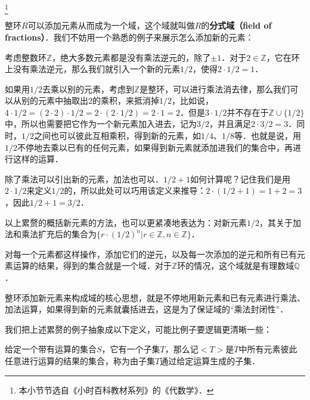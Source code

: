 


\footnote{本小节节选自《小时百科教材系列》的《代数学》．}


整环$R$可以添加元素从而成为一个域，这个域就叫做$R$的\textbf{分式域（field of fractions）}．我们不妨用一个熟悉的例子来展示怎么添加新的元素：

\begin{example}{}
考虑整数环$\mathbb{Z}$，绝大多数元素都是没有乘法逆元的，除了$\pm 1$．对于$2\in\mathbb{Z}$，它在环上没有乘法逆元，那么我们就引入一个新的元素$1/2$，使得$2\cdot 1/2=1$．

如果用$1/2$去乘以别的元素，考虑到$\mathbb{Z}$是整环，可以进行乘法消去律，那么我们可以从别的元素中抽取出$2$的乘积，来抵消掉$1/2$，比如说，$4\cdot 1/2=(2\cdot 2)\cdot 1/2=2\cdot(2\cdot 1/2)=2\cdot 1=2$．但是$3\cdot 1/2$并不存在于$\mathbb{Z}\cup\{1/2\}$中，所以也需要把它作为一个新元素加入进去，记为$3/2$，并且满足$2\cdot 3/2=3$．同时，$1/2$之间也可以彼此互相乘积，得到新的元素，如$1/4$、$1/8$等．也就是说，用$1/2$不停地去乘以已有的任何元素，如果得到新元素就添加进我们的集合中，再进行这样的运算．

除了乘法可以引出新的元素，加法也可以．$1/2+1$如何计算呢？记住我们是用$2\cdot 1/2$来定义$1/2$的，所以此处可以巧用该定义来推导：$2\cdot(1/2+1)=1+2=3$，因此$1/2+1=3/2$．

以上累赘的概括新元素的方法，也可以更紧凑地表达为：对新元素$1/2$，其关于加法和乘法扩充后的集合为$\{r\cdot (1/2)^n|r\in\mathbb{Z}, n\in \mathbb{Z}\}$．

对每一个元素都这样操作，添加它们的逆元，以及每一次添加的逆元和所有已有元素运算的结果，得到的集合就是一个域．对于$\mathbb{Z}$环的情况，这个域就是有理数域$\mathbb{Q}$．
\end{example}

整环添加新元素来构成域的核心思想，就是不停地用新元素和已有元素进行乘法、加法运算，如果得到新的元素就囊括进去，这是为了保证域的“乘法封闭性”．

我们把上述累赘的例子抽象成以下定义，可能比例子要逻辑更清晰一些：

\begin{definition}{}
给定一个带有运算的集合$S$，它有一个子集$T$，那么记$<T>$是$T$中所有元素彼此任意进行运算的结果的集合，称为由子集$T$通过给定运算生成的子集．
\end{definition}

